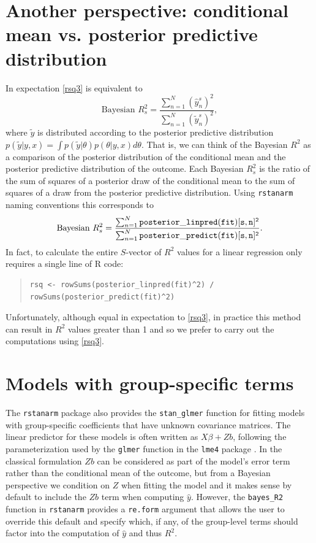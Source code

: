 \documentclass[11pt]{article}
\begin{document}
\section{Another perspective: conditional mean vs. posterior predictive distribution}
In expectation \eqref{rsq3} is equivalent to 
\begin{equation}\label{rsq4}
\mbox{Bayesian } R^2_s = 
	\frac{\sum_{n=1}^N (\hat{y}_n^s)^2}{\sum_{n=1}^N (\tilde{y}_n^s)^2},
\end{equation}
%
where $\tilde{y}$ is distributed according to the posterior predictive distribution 
$p(\tilde{y} | y, x) = \int p(\tilde{y} | \theta) p(\theta | y, x) d\theta$. That is, we can 
think of the Bayesian $R^2$ as a comparison of the posterior distribution of the 
conditional mean and the posterior predictive distribution of the outcome. 
Each Bayesian $R^2_s$ is the ratio of the sum of squares of a 
posterior draw of the conditional mean to the sum of squares of a draw from the posterior 
predictive distribution. Using {\tt rstanarm} naming conventions this corresponds to 
%
\begin{equation*}
\mbox{Bayesian } R^2_s = 
	\frac{\sum_{n=1}^N {\tt posterior\_linpred(fit)[s,n]^2}}{\sum_{n=1}^N {\tt posterior\_predict(fit)[s,n]^2}}.
\end{equation*}
%
In fact, to calculate the entire $S$-vector of $R^2$ values for a linear regression only requires a single 
line of R code:
%
\vspace{-\baselineskip}
\begin{quotation}
\noindent
\begin{small}
\begin{verbatim}
rsq <- rowSums(posterior_linpred(fit)^2) / rowSums(posterior_predict(fit)^2)
\end{verbatim}
\end{small}
\end{quotation}
%
Unfortunately, although equal in expectation to \eqref{rsq3}, in practice this method can result
in $R^2$ values greater than 1 and so we prefer to carry out the computations using \eqref{rsq3}. 


\section{Models with group-specific terms}
The {\tt rstanarm} package also provides the \verb#stan_glmer# function for
fitting models with group-specific coefficients that have unknown covariance
matrices. The linear predictor for these models is often written as
$X \beta + Zb$, following the parameterization used by the \verb#glmer#
function in the {\tt lme4} package \citep{lme4Rpackage}. In the classical
formulation $Zb$ can be considered as part of the model's error term rather than
the conditional mean of the outcome, but from a Bayesian perspective we
condition on $Z$ when fitting the model and it makes sense by default to include
the $Zb$ term when computing $\hat{y}$. However, the \verb#bayes_R2# function in
{\tt rstanarm} provides a {\tt re.form} argument that allows the user to
override this default and specify which, if any, of the group-level terms should
factor into the computation of $\hat{y}$ and thus $R^2$.
\end{document}
